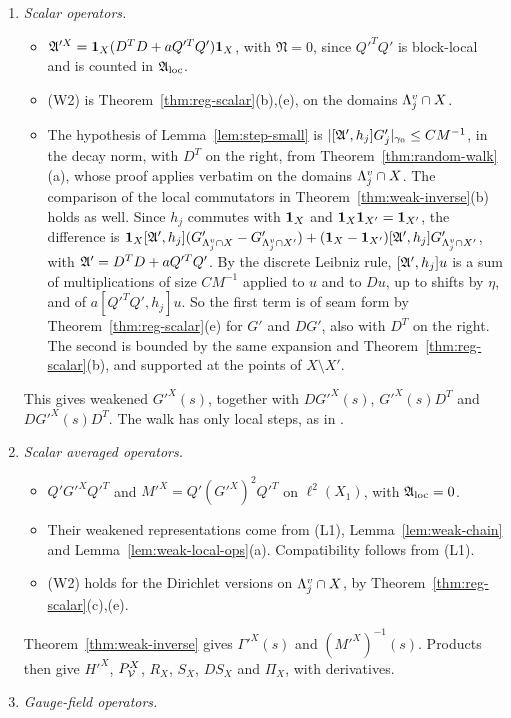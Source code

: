 \begin{enumerate}[label=(L\arabic*)]
\item \emph{Scalar operators.}
  \begin{itemize}
  \item $\mathfrak A'^X=\mathbf 1_X(D^TD+aQ'^TQ')\mathbf 1_X$, with $\mathfrak N=0$, since $Q'^TQ'$ is block-local and is counted in $\mathfrak A_{\rm loc}$.
  \item (W2) is Theorem~\ref{thm:reg-scalar}(b),(e), on the domains $\Lambda^v_j\cap X$.
  \item The hypothesis of Lemma~\ref{lem:step-small} is $|[\mathfrak A',h_j]G'_j|_{\gamma_0}\le CM^{-1}$, in the decay norm, with $D^T$ on the right, from Theorem~\ref{thm:random-walk}(a), whose proof applies verbatim on the domains $\Lambda^v_j\cap X$. The comparison of the local commutators in Theorem~\ref{thm:weak-inverse}(b) holds as well. Since $h_j$ commutes with $\mathbf 1_X$ and $\mathbf 1_X\mathbf 1_{X'}=\mathbf 1_{X'}$, the difference is $\mathbf 1_X[\mathfrak A',h_j](G'_{\Lambda^v_j\cap X}-G'_{\Lambda^v_j\cap X'})+(\mathbf 1_X-\mathbf 1_{X'})[\mathfrak A',h_j]G'_{\Lambda^v_j\cap X'}$, with $\mathfrak A'=D^TD+aQ'^TQ'$. By the discrete Leibniz rule, $[\mathfrak A',h_j]u$ is a sum of multiplications of size $CM^{-1}$ applied to $u$ and to $Du$, up to shifts by $\eta$, and of $a[Q'^TQ',h_j]u$. So the first term is of seam form by Theorem~\ref{thm:reg-scalar}(e) for $G'$ and $DG'$, also with $D^T$ on the right. The second is bounded by the same expansion and Theorem~\ref{thm:reg-scalar}(b), and supported at the points of $X\setminus X'$.
  \end{itemize}
  This gives weakened $G'^X(s)$, together with $DG'^X(s)$, $G'^X(s)D^T$ and $DG'^X(s)D^T$. The walk has only local steps, as in \cite[Lemma~6]{DimockI}.
\item \emph{Scalar averaged operators.}
  \begin{itemize}
  \item $Q'G'^XQ'^T$ and $M'^X=Q'(G'^X)^2Q'^T$ on $\ell^2(X_1)$, with $\mathfrak A_{\rm loc}=0$.
  \item Their weakened representations come from (L1), Lemma~\ref{lem:weak-chain} and Lemma~\ref{lem:weak-local-ops}(a). Compatibility follows from (L1).
  \item (W2) holds for the Dirichlet versions on $\Lambda^v_j\cap X$, by Theorem~\ref{thm:reg-scalar}(c),(e).
  \end{itemize}
  Theorem~\ref{thm:weak-inverse} gives $\Gamma'^X(s)$ and $(M'^X)^{-1}(s)$. Products then give $H'^X$, $P^X_\mathcal V$, $R_X$, $S_X$, $DS_X$ and $\Pi_X$, with derivatives.
\item \emph{Gauge-field operators.}

\end{enumerate}
